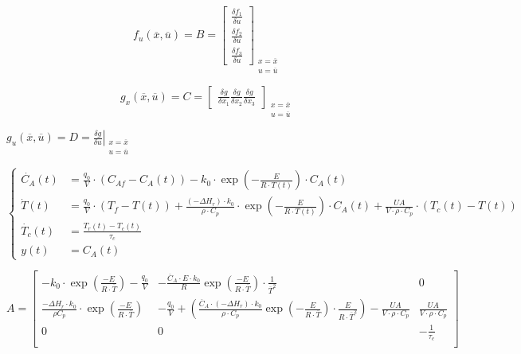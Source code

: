 \documentclass{report}
\begin{document}
	\begin{equation}
		f_u(\overline{x},\overline{u}) = B =
		\begin{bmatrix}
			\frac{\delta f_1}{\delta u} \\[5pt]
			\frac{\delta f_2}{\delta u} \\[5pt]
			\frac{\delta f_3}{\delta u}
		\end{bmatrix}_{\substack{x=\overline{x} \\ u=\overline{u}}}
	\end{equation}
	
		\begin{equation}
		g_x(\overline{x},\overline{u}) = C =
		\begin{bmatrix}
			\frac{\delta g}{\delta x_1} 
			\frac{\delta g}{\delta x_2}
			\frac{\delta g}{\delta x_3}
		\end{bmatrix}_{\substack{x=\overline{x} \\ u=\overline{u}}}
	\end{equation}
	
	$g_u(\overline{x}, \overline{u}) = D = \left.\frac{\delta g}{\delta u}\right|_{\substack{x=\overline{x} \\ u=\overline{u}}}$
	
	
	\begin{equation}
		\begin{cases}
			\dot{C_A}(t) &= \frac{q_0}{V}\cdot (C_{Af}-C_A(t))-k_0\cdot \exp \left({-\frac{E}{R\cdot T(t)}} \right) \cdot C_A(t) \\[7pt]
			\dot{T}(t)&=\frac{q_0}{V}\cdot (T_f-T(t))+ \frac{(-\Delta H_r)\cdot k_0}{\rho \cdot C_p}\cdot \exp{\left( -\frac{E}{R \cdot T(t)} \right)}\cdot C_A(t) + \frac{UA}{V\cdot\rho\cdot C_p}\cdot(T_c(t) - T(t))\\[7pt]
			\dot{T_c}(t) &= \frac{T_r(t)-T_c(t)}{\tau_c} \\[7pt]
			y(t) &= C_A(t)
		\end{cases}
	\end{equation}
	
	\begin{equation}
	A =
		\begin{bmatrix}
			-k_0\cdot \exp{\left(\frac{-E}{R\cdot \overline{T}}\right)}-\frac{q_0}{V} & - \frac{\overline{C}_A\cdot E \cdot k_0}{R} \exp{\left(\frac{-E}{R\cdot\overline{T}} \right)}\cdot\frac{1}{\overline{T}^2} & 0 \\[10pt]
			
			\frac{-\Delta H_r \cdot k_0}{\rho C_p} \cdot\exp{\left(\frac{-E}{R\cdot \overline{T}}\right)}&-\frac{q_0}{V}+ (\frac{\overline{C}_A\cdot (-\Delta H_r)\cdot k_0}{\rho\cdot C_p} \exp{\left(-\frac{E}{R \cdot\overline{T}} \right)}\cdot\frac{E}{R\cdot\overline{T}^2}) - \frac{UA}{V\cdot\rho\cdot C_p}  & \frac{UA}{V\cdot\rho\cdot C_p} \\[10pt]
			
			
			0 & 0 & -\frac{1}{\tau_c} \\			
		\end{bmatrix}
	\end{equation}
	
\end{document}
